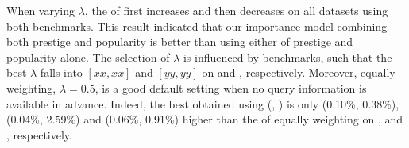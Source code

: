 When varying $\lambda$, the \PairAcc of \ensemblerank first increases and then decreases on all datasets using both benchmarks. This result indicated that our importance model combining both prestige and popularity is better than using either of prestige and popularity alone. The selection of $\lambda$ is influenced by benchmarks, such that the best $\lambda$ falls into $[xx,xx]$ and $[yy,yy]$ on \fcita and \recom, respectively. Moreover, equally weighting, \ie $\lambda=0.5$, is a good default setting when no query information is available in advance.
Indeed, the best obtained \PairAcc using (\fcita, \recom) is only (0.10\%, 0.38\%), (0.04\%, 2.59\%) and (0.06\%, 0.91\%)  higher than the \PairAcc of equally weighting on \aan, \aminer and \magdata, respectively. 

